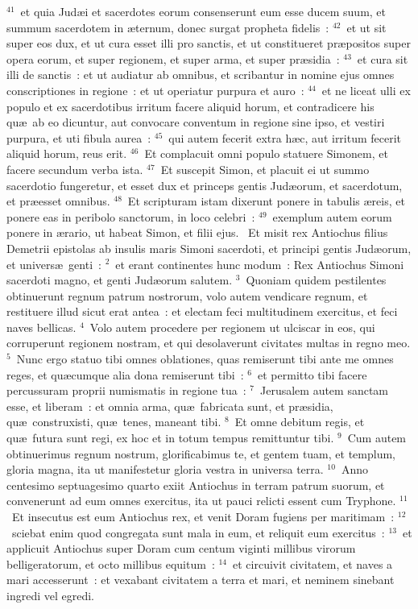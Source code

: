 ${}^{41}$~et quia Jud\ae i et sacerdotes eorum consenserunt eum esse ducem suum, et summum sacerdotem in \ae ternum, donec surgat propheta fidelis~:
${}^{42}$~et ut sit super eos dux, et ut cura esset illi pro sanctis, et ut constitueret pr\ae positos super opera eorum, et super regionem, et super arma, et super pr\ae sidia~:
${}^{43}$~et cura sit illi de sanctis~: et ut audiatur ab omnibus, et scribantur in nomine ejus omnes conscriptiones in regione~: et ut operiatur purpura et auro~:
${}^{44}$~et ne liceat ulli ex populo et ex sacerdotibus irritum facere aliquid horum, et contradicere his qu\ae\ ab eo dicuntur, aut convocare conventum in regione sine ipso, et vestiri purpura, et uti fibula aurea~:
${}^{45}$~qui autem fecerit extra h\ae c, aut irritum fecerit aliquid horum, reus erit.
${}^{46}$~Et complacuit omni populo statuere Simonem, et facere secundum verba ista.
${}^{47}$~Et suscepit Simon, et placuit ei ut summo sacerdotio fungeretur, et esset dux et princeps gentis Jud\ae orum, et sacerdotum, et pr\ae esset omnibus.
${}^{48}$~Et scripturam istam dixerunt ponere in tabulis \ae reis, et ponere eas in peribolo sanctorum, in loco celebri~:
${}^{49}$~exemplum autem eorum ponere in \ae rario, ut habeat Simon, et filii ejus.
~\lettrine[lines=10,image=true,loversize=0.05,lraise=-0.03]{E}{}t misit rex Antiochus filius Demetrii epistolas ab insulis maris Simoni sacerdoti, et principi gentis Jud\ae orum, et univers\ae\ genti~:
${}^{2}$~et erant continentes hunc modum~: Rex Antiochus Simoni sacerdoti magno, et genti Jud\ae orum salutem.
${}^{3}$~Quoniam quidem pestilentes obtinuerunt regnum patrum nostrorum, volo autem vendicare regnum, et restituere illud sicut erat antea~: et electam feci multitudinem exercitus, et feci naves bellicas.
${}^{4}$~Volo autem procedere per regionem ut ulciscar in eos, qui corruperunt regionem nostram, et qui desolaverunt civitates multas in regno meo.
${}^{5}$~Nunc ergo statuo tibi omnes oblationes, quas remiserunt tibi ante me omnes reges, et qu\ae cumque alia dona remiserunt tibi~:
${}^{6}$~et permitto tibi facere percussuram proprii numismatis in regione tua~:
${}^{7}$~Jerusalem autem sanctam esse, et liberam~: et omnia arma, qu\ae\ fabricata sunt, et pr\ae sidia, qu\ae\ construxisti, qu\ae\ tenes, maneant tibi.
${}^{8}$~Et omne debitum regis, et qu\ae\ futura sunt regi, ex hoc et in totum tempus remittuntur tibi.
${}^{9}$~Cum autem obtinuerimus regnum nostrum, glorificabimus te, et gentem tuam, et templum, gloria magna, ita ut manifestetur gloria vestra in universa terra.
${}^{10}$~Anno centesimo septuagesimo quarto exiit Antiochus in terram patrum suorum, et convenerunt ad eum omnes exercitus, ita ut pauci relicti essent cum Tryphone.
${}^{11}$~Et insecutus est eum Antiochus rex, et venit Doram fugiens per maritimam~:
${}^{12}$~sciebat enim quod congregata sunt mala in eum, et reliquit eum exercitus~:
${}^{13}$~et applicuit Antiochus super Doram cum centum viginti millibus virorum belligeratorum, et octo millibus equitum~:
${}^{14}$~et circuivit civitatem, et naves a mari accesserunt~: et vexabant civitatem a terra et mari, et neminem sinebant ingredi vel egredi.


